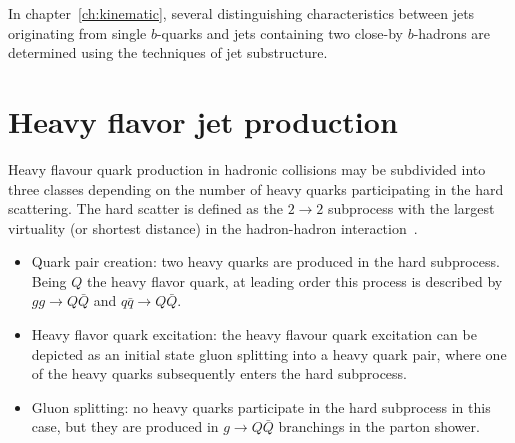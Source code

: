 

In chapter~\ref{ch:kinematic}, several distinguishing characteristics between jets originating from single $b$-quarks and jets containing two close-by  $b$-hadrons are determined using the techniques of jet substructure. 







\section{Heavy flavor jet production}%

Heavy flavour quark production in hadronic collisions may be subdivided into three classes depending on the number of heavy quarks participating in the hard scattering. The hard scatter is defined as the $2 \rightarrow 2$ subprocess with the largest virtuality (or shortest distance) in the hadron-hadron interaction~\cite{Norrbin:2000zc}.


\begin{itemize}\addtolength{\itemsep}{-0.4\baselineskip}
\item
Quark pair creation: two heavy quarks are produced in the hard subprocess. Being $Q$ the heavy flavor quark, at leading order this process is described by $gg \rightarrow Q\bar{Q}$ and  $q\bar{q} \rightarrow Q\bar{Q}$.
\item
Heavy flavor quark excitation: the heavy flavour quark excitation can be depicted as an initial state gluon splitting into a heavy quark pair, where one of the heavy quarks subsequently enters the hard subprocess.
\item
Gluon splitting: no heavy quarks participate in the hard subprocess in this case, but they are produced in $g \rightarrow Q\bar{Q}$ branchings in the parton shower.
\end{itemize}

